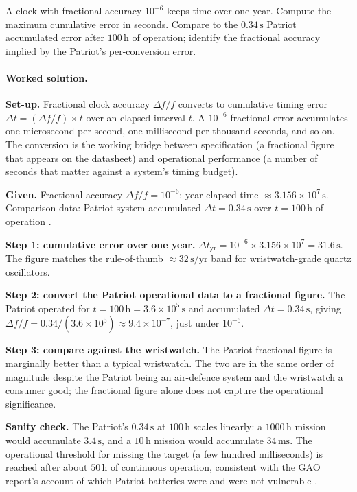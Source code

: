 \begin{exercise}
A clock with fractional accuracy $10^{-6}$ keeps time over one year.
Compute the maximum cumulative error in seconds. Compare to the
$0.34 \,\si{\second}$ Patriot accumulated error after $100 \,\si
{\hour}$ of operation; identify the fractional accuracy implied by
the Patriot's per-conversion error.

\paragraph{Worked solution.}
\textbf{Set-up.} Fractional clock accuracy $\Delta f/f$ converts
to cumulative timing error $\Delta t = (\Delta f/f) \times t$ over
an elapsed interval $t$. A $10^{-6}$ fractional error accumulates
one microsecond per second, one millisecond per thousand seconds,
and so on. The conversion is the working bridge between
specification (a fractional figure that appears on the datasheet)
and operational performance (a number of seconds that matter
against a system's timing budget).

\textbf{Given.} Fractional accuracy $\Delta f/f = 10^{-6}$; year
elapsed time $\approx 3.156 \times 10^{7} \,\si{\second}$.
Comparison data: Patriot system accumulated $\Delta t = 0.34 \,\si
{\second}$ over $t = 100 \,\si{\hour}$ of operation
\cite{acc:gao-patriot-1992}.

\textbf{Step 1: cumulative error over one year.}
$\Delta t_{\text{yr}} = 10^{-6} \times 3.156 \times 10^{7} =
31.6 \,\si{\second}$. The figure matches the rule-of-thumb
$\approx 32 \,\si{\second}/\text{yr}$ band for wristwatch-grade
quartz oscillators.

\textbf{Step 2: convert the Patriot operational data to a
fractional figure.} The Patriot operated for $t = 100 \,\si{\hour}
= 3.6 \times 10^{5} \,\si{\second}$ and accumulated $\Delta t =
0.34 \,\si{\second}$, giving $\Delta f/f = 0.34/(3.6 \times 10^{5})
\approx 9.4 \times 10^{-7}$, just under $10^{-6}$.

\textbf{Step 3: compare against the wristwatch.} The Patriot
fractional figure is marginally better than a typical wristwatch.
The two are in the same order of magnitude despite the Patriot
being an air-defence system and the wristwatch a consumer good;
the fractional figure alone does not capture the operational
significance.

\textbf{Sanity check.} The Patriot's $0.34 \,\si{\second}$ at
$100 \,\si{\hour}$ scales linearly: a $1000 \,\si{\hour}$ mission
would accumulate $3.4 \,\si{\second}$, and a $10 \,\si{\hour}$
mission would accumulate $34 \,\si{\milli\second}$. The
operational threshold for missing the target (a few hundred
milliseconds) is reached after about $50 \,\si{\hour}$ of
continuous operation, consistent with the GAO report's account
of which Patriot batteries were and were not vulnerable
\cite{acc:gao-patriot-1992}.


\end{exercise}

